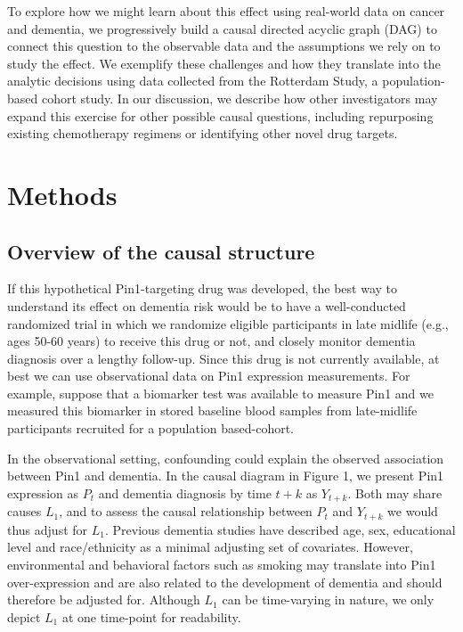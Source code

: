 \documentclass[
]{book}
\begin{document}
To explore how we might learn about this effect using real-world data on cancer and dementia, we progressively build a causal directed acyclic graph (DAG) to connect this question to the observable data and the assumptions we rely on to study the effect. We exemplify these challenges and how they translate into the analytic decisions using data collected from the Rotterdam Study, a population-based cohort study. In our discussion, we describe how other investigators may expand this exercise for other possible causal questions, including repurposing existing chemotherapy regimens or identifying other novel drug targets.

\hypertarget{methods-2}{%
\section{Methods}\label{methods-2}}

\hypertarget{overview-of-the-causal-structure}{%
\subsection{Overview of the causal structure}\label{overview-of-the-causal-structure}}

If this hypothetical Pin1-targeting drug was developed, the best way to understand its effect on dementia risk would be to have a well-conducted randomized trial in which we randomize eligible participants in late midlife (e.g., ages 50-60 years) to receive this drug or not, and closely monitor dementia diagnosis over a lengthy follow-up. Since this drug is not currently available, at best we can use observational data on Pin1 expression measurements. For example, suppose that a biomarker test was available to measure Pin1 and we measured this biomarker in stored baseline blood samples from late-midlife participants recruited for a population based-cohort.

In the observational setting, confounding could explain the observed association between Pin1 and dementia. In the causal diagram \autocite{whatif2020} in Figure 1, we present Pin1 expression as \(P_{t}\) and dementia diagnosis by time \(t+k\) as \(Y_{t+k}\). Both may share causes \(L_1\), and to assess the causal relationship between \(P_{t}\) and \(Y_{t+k}\) we would thus adjust for \(L_1\). Previous dementia studies have described age, sex, educational level and race/ethnicity as a minimal adjusting set of covariates\autocite{ospina2020}. However, environmental and behavioral factors such as smoking may translate into Pin1 over-expression\autocite{tan2010} and are also related to the development of dementia\autocite{dementia_lancet} and should therefore be adjusted for. Although \(L_1\) can be time-varying in nature, we only depict \(L_1\) at one time-point for readability.
\end{document}
